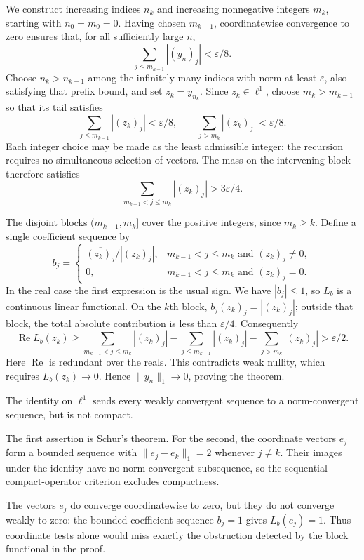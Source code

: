 We construct increasing indices $n_k$ and increasing nonnegative
integers $m_k$, starting with $n_0=m_0=0$. Having chosen $m_{k-1}$,
coordinatewise convergence to zero ensures that, for all sufficiently
large $n$,
\[
\sum_{j\leq m_{k-1}}|(y_n)_j|<\varepsilon/8.
\]
Choose $n_k>n_{k-1}$ among the infinitely many indices
with norm at least $\varepsilon$, also satisfying that prefix bound,
and set $z_k=y_{n_k}$. Since $z_k\in\ell^1$, choose
$m_k>m_{k-1}$ so that its tail satisfies
\[
\sum_{j\leq m_{k-1}}|(z_k)_j|<\varepsilon/8,
\qquad
\sum_{j>m_k}|(z_k)_j|<\varepsilon/8.
\]
Each integer choice may be made as the least admissible integer;
the recursion requires no simultaneous selection of vectors.
The mass on the intervening block therefore satisfies
\[
\sum_{m_{k-1}<j\leq m_k}|(z_k)_j|>3\varepsilon/4.
\]

The disjoint blocks $(m_{k-1},m_k]$ cover the positive integers,
since $m_k\geq k$. Define a single coefficient sequence by
\[
b_j=\begin{cases}
\overline{(z_k)_j}/|(z_k)_j|,&
 m_{k-1}<j\leq m_k\text{ and }(z_k)_j\ne0,\\
0,&m_{k-1}<j\leq m_k\text{ and }(z_k)_j=0.
\end{cases}
\]
In the real case the first expression is the usual sign.
We have $|b_j|\leq1$, so $L_b$ is a continuous linear functional.
On the $k$th block, $b_j(z_k)_j=|(z_k)_j|$; outside that block,
the total absolute contribution is less than $\varepsilon/4$.
Consequently
\[
\operatorname{Re}L_b(z_k)
\geq\sum_{m_{k-1}<j\leq m_k}|(z_k)_j|
 -\sum_{j\leq m_{k-1}}|(z_k)_j|
 -\sum_{j>m_k}|(z_k)_j|
>\varepsilon/2.
\]
Here $\operatorname{Re}$ is redundant over the reals. This contradicts
weak nullity, which requires $L_b(z_k)\to0$. Hence
$\|y_n\|_1\to0$, proving the theorem.
\Done

\begin{corollary}
The identity on $\ell^1$ sends every weakly convergent sequence to a
norm-convergent sequence, but is not compact.
\end{corollary}
\Proof
The first assertion is Schur's theorem. For the second, the coordinate
vectors $e_j$ form a bounded sequence with
$\|e_j-e_k\|_1=2$ whenever $j\ne k$. Their images under the identity
have no norm-convergent subsequence, so the sequential compact-operator
criterion excludes compactness.
\Done

The vectors $e_j$ do converge coordinatewise to zero, but they do not
converge weakly to zero: the bounded coefficient sequence $b_j=1$
gives $L_b(e_j)=1$. Thus coordinate tests alone would miss exactly
the obstruction detected by the block functional in the proof.

